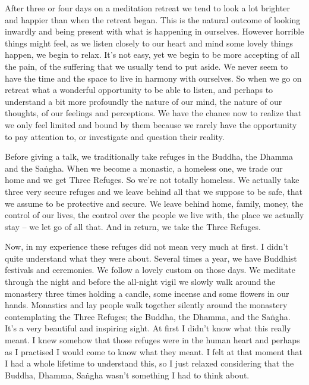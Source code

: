 

After three or four days on a meditation retreat we tend to look a lot brighter and happier than when the retreat began. This is the natural outcome of looking inwardly and being present with what is happening in ourselves. However horrible things might feel, as we listen closely to our heart and mind some lovely things happen, we begin to relax. It's not easy, yet we begin to be more accepting of all the pain, of the suffering that we usually tend to put aside. We never seem to have the time and the space to live in harmony with ourselves. So when we go on retreat what a wonderful opportunity to be able to listen, and perhaps to understand a bit more profoundly the nature of our mind, the nature of our thoughts, of our feelings and perceptions. We have the chance now to realize that we only feel limited and bound by them \mbox{because} we rarely have the opportunity to pay attention to, or investigate and question their reality.

Before giving a talk, we traditionally take refuges in the Buddha, the Dhamma and the Sa\.ngha. When we become a monastic, a homeless one, we trade our home and we get Three Refuges. So we're not totally homeless. We actually take three very secure refuges and we leave behind all that we suppose to be safe, that we assume to be protective and secure. We leave behind home, family, money, the control of our lives, the control over the people we live with, the place we actually stay -- we let go of all that. And in return, we take the Three Refuges. 

Now, in my experience these refuges did not mean very much at first. I didn't quite understand what they were about. Several times a year, we have Buddhist festivals and ceremonies. We follow a lovely custom on those days. We meditate through the night and before the all-night vigil we slowly walk around the monastery three times holding a candle, some incense and some flowers in our hands. Monastics and lay people walk together silently around the monastery contemplating the Three Refuges; the Buddha, the Dhamma, and the Sa\.ngha. It's a very beautiful and inspiring sight. At first I didn't know what this really meant. I knew somehow that those refuges were in the human heart and perhaps as I practised I would come to know what they meant. I felt at that moment that I had a whole lifetime to understand this, so I just relaxed considering that the Buddha, Dhamma, Sa\.ngha wasn't something I had to think about.  

